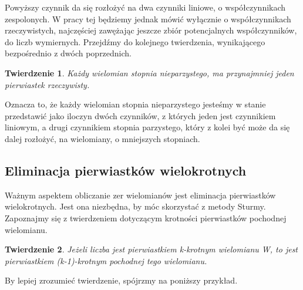 \documentclass[twoside,a4paper]{book}
\newtheorem{theorem}{Twierdzenie}
\begin{document}
Powyższy czynnik da się rozłożyć na dwa czynniki liniowe, o współczynnikach zespolonych. W pracy tej będziemy jednak mówić wyłącznie o współczynnikach rzeczywistych, najczęściej zawężając jeszcze zbiór potencjalnych współczynników, do liczb wymiernych. Przejdźmy do kolejnego twierdzenia, wynikającego bezpośrednio z dwóch poprzednich.

\begin{theorem}
	Każdy wielomian stopnia nieparzystego, ma przynajmniej jeden pierwiastek rzeczywisty.
\end{theorem}

Oznacza to, że każdy wielomian stopnia nieparzystego jesteśmy w stanie przedstawić jako iloczyn dwóch czynników, z których jeden jest czynnikiem liniowym, a drugi czynnikiem stopnia parzystego, który z kolei być może da się dalej rozłożyć, na wielomiany, o mniejszych stopniach.

\subsection{Eliminacja pierwiastków wielokrotnych}

Ważnym aspektem obliczanie zer wielomianów jest eliminacja pierwiastków wielokrotnych. Jest ona niezbędna, by móc skorzystać z metody Sturmy. Zapoznajmy się z twierdzeniem dotyczącym krotności pierwiastków pochodnej wielomianu.

\begin{theorem}
	Jeżeli liczba jest pierwiastkiem k-krotnym wielomianu W, to jest pierwiastkiem (k-1)-krotnym pochodnej tego wielomianu.
\end{theorem}

By lepiej zrozumieć twierdzenie, spójrzmy na poniższy przykład.
\end{document}
